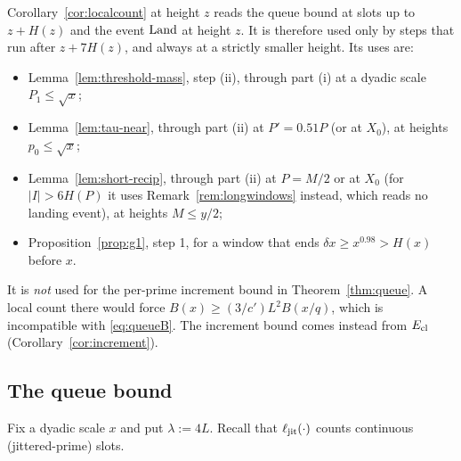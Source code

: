 \begin{remark}\label{rem:localcount-uses}
Corollary~\ref{cor:localcount} at height $z$ reads the queue bound at slots up to $z+H(z)$ and the event $\mathrm{Land}$ at height $z$. It is
therefore used only by steps that run after $z+7H(z)$, and always at a strictly smaller height. Its uses are:
\begin{itemize}
\item Lemma~\ref{lem:threshold-mass}, step (ii), through part (i) at a dyadic scale $P_1\le\sqrt x$;
\item Lemma~\ref{lem:tau-near}, through part (ii) at $P'=0.51P$ (or at $X_0$), at heights $p_0\le\sqrt x$;
\item Lemma~\ref{lem:short-recip}, through part (ii) at $P=M/2$ or at $X_0$ (for $|I|>6H(P)$ it uses Remark~\ref{rem:longwindows} instead, which reads no landing event), at heights $M\le y/2$;
\item Proposition~\ref{prop:g1}, step 1, for a window that ends $\delta x\ge x^{0.98}>H(x)$ before $x$.
\end{itemize}
It is \emph{not} used for the per-prime increment bound in Theorem~\ref{thm:queue}. A local count there would force
$B(x)\ge(3/c')L^2B(x/q)$, which is incompatible with \eqref{eq:queueB}. The increment bound comes instead from $E_{\mathrm{cl}}$
(Corollary~\ref{cor:increment}).
\end{remark}

\subsection{The queue bound}\label{sec:queue-bound}

Fix a dyadic scale $x$ and put $\lambda:=4L$. Recall that $\ell_{\mathrm{jit}}(\cdot)$ counts continuous (jittered-prime) slots.

